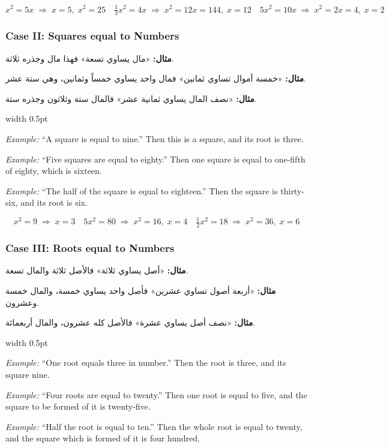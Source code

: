 \documentclass[10pt,a4paper]{book}
\newlength{\colwidth}
\newcommand{\bilingualpair}[2]{%
  \noindent
  \begin{minipage}[t]{\colwidth}
  \begin{flushright}
  \vspace{0pt}
  {\arabicfont\small #1}
  \end{flushright}
  \end{minipage}%
  \hfill\textcolor{columnsepclr}{\vrule width 0.5pt}\hfill
  \begin{minipage}[t]{\colwidth}
  \vspace{0pt}
  {\small #2}
  \end{minipage}%
  \par\vspace{0.6em}
}
\begin{document}
\begin{equation}
\boxed{x^2 = 5x \;\Rightarrow\; x = 5, \; x^2 = 25}
\quad
\boxed{\tfrac{1}{3}x^2 = 4x \;\Rightarrow\; x^2 = 12x = 144, \; x = 12}
\quad
\boxed{5x^2 = 10x \;\Rightarrow\; x^2 = 2x = 4, \; x = 2}
\end{equation}

\subsubsection*{Case II: Squares equal to Numbers}

\bilingualpair{
\textbf{مثال:} «مال يساوي تسعة» فهذا مال وجذره ثلاثة.

\textbf{مثال:} «خمسة أموال تساوي ثمانين» فمال واحد يساوي خمساً وثمانين،
وهي ستة عشر.

\textbf{مثال:} «نصف المال يساوي ثمانية عشر» فالمال ستة وثلاثون
وجذره ستة.
}{
\textit{Example:} ``A square is equal to nine.'' Then this is a square, and its
root is three.

\textit{Example:} ``Five squares are equal to eighty.'' Then one square is equal
to one-fifth of eighty, which is sixteen.

\textit{Example:} ``The half of the square is equal to eighteen.'' Then the
square is thirty-six, and its root is six.
}

\begin{equation}
\boxed{x^2 = 9 \;\Rightarrow\; x = 3}
\quad
\boxed{5x^2 = 80 \;\Rightarrow\; x^2 = 16, \; x = 4}
\quad
\boxed{\tfrac{1}{2}x^2 = 18 \;\Rightarrow\; x^2 = 36, \; x = 6}
\end{equation}

\subsubsection*{Case III: Roots equal to Numbers}

\bilingualpair{
\textbf{مثال:} «أصل يساوي ثلاثة» فالأصل ثلاثة والمال تسعة.

\textbf{مثال:} «أربعة أصول تساوي عشرين» فأصل واحد يساوي خمسة،
والمال خمسة وعشرون.

\textbf{مثال:} «نصف أصل يساوي عشرة» فالأصل كله عشرون، والمال
أربعمائة.
}{
\textit{Example:} ``One root equals three in number.'' Then the root is three,
and its square nine.

\textit{Example:} ``Four roots are equal to twenty.'' Then one root is equal to
five, and the square to be formed of it is twenty-five.

\textit{Example:} ``Half the root is equal to ten.'' Then the whole root is equal
to twenty, and the square which is formed of it is four hundred.
}
\end{document}
